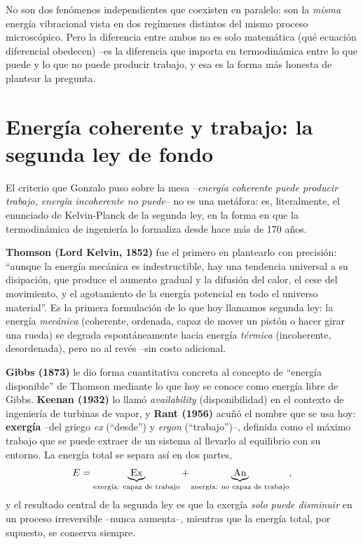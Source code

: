 \documentclass[11pt,a4paper]{article}
\begin{document}
No son dos fenómenos independientes que coexisten en paralelo: son la
\emph{misma} energía vibracional vista en dos regímenes distintos del
mismo proceso microscópico. Pero la diferencia entre ambos no es solo
matemática (qué ecuación diferencial obedecen) --es la diferencia que
importa en termodinámica entre lo que puede y lo que no puede producir
trabajo, y esa es la forma más honesta de plantear la pregunta.

\section{Energía coherente y trabajo: la segunda ley de fondo}
\label{sec:segunda_ley}

El criterio que Gonzalo puso sobre la mesa --\emph{energía coherente puede
producir trabajo, energía incoherente no puede}-- no es una metáfora: es,
literalmente, el enunciado de Kelvin-Planck de la segunda ley, en la forma
en que la termodinámica de ingeniería lo formaliza desde hace más de 170
años.

\textbf{Thomson (Lord Kelvin, 1852)} \cite{Kelvin1852} fue el primero en
plantearlo con precisión: ``aunque la energía mecánica es indestructible,
hay una tendencia universal a su disipación, que produce el aumento
gradual y la difusión del calor, el cese del movimiento, y el agotamiento
de la energía potencial en todo el universo material''. Es la primera
formulación de lo que hoy llamamos segunda ley: la energía \emph{mecánica}
(coherente, ordenada, capaz de mover un pistón o hacer girar una rueda) se
degrada espontáneamente hacia energía \emph{térmica} (incoherente,
desordenada), pero no al revés --sin costo adicional.

\textbf{Gibbs (1873)} \cite{Gibbs1873} le dio forma cuantitativa concreta
al concepto de ``energía disponible'' de Thomson mediante lo que hoy se
conoce como energía libre de Gibbs. \textbf{Keenan (1932)} \cite{Keenan1932}
lo llamó \emph{availability} (disponibilidad) en el contexto de ingeniería
de turbinas de vapor, y \textbf{Rant (1956)} \cite{Rant1956} acuñó el
nombre que se usa hoy: \textbf{exergía} --del griego \textit{ex} (``desde'')
y \textit{ergon} (``trabajo'')--, definida como el máximo trabajo que se
puede extraer de un sistema al llevarlo al equilibrio con su entorno. La
energía total se separa así en dos partes,
\begin{equation}
E = \underbrace{\rm Ex}_{\text{exergía: capaz de trabajo}}
    + \underbrace{\rm An}_{\text{anergía: no capaz de trabajo}},
\label{eq:exergia}
\end{equation}
y el resultado central de la segunda ley es que la exergía \emph{solo puede
disminuir} en un proceso irreversible --nunca aumenta--, mientras que la
energía total, por supuesto, se conserva siempre.
\end{document}
